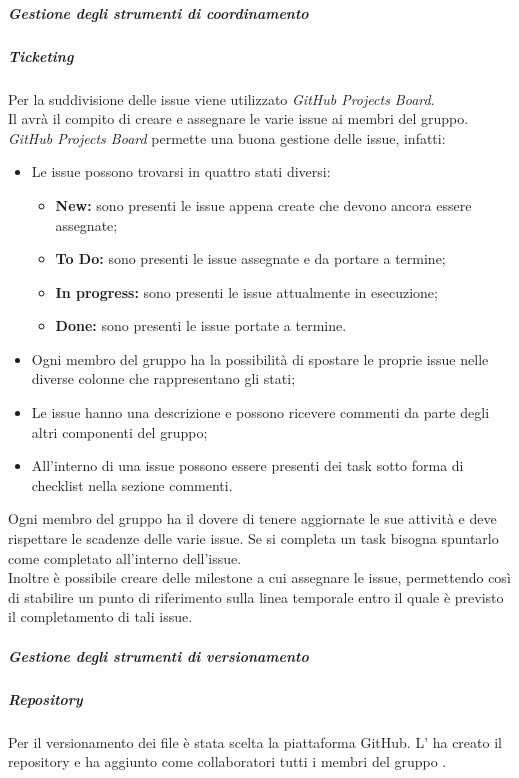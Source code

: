 \subparagraph{Gestione degli strumenti di coordinamento}
\subparagraph*{Ticketing}
Per la suddivisione delle issue\glo{} viene utilizzato \textit{GitHub Projects Board}\glo{}.\\
Il \roleProjectManagerLow{} avrà il compito di creare e assegnare le varie issue\glo{} ai membri del gruppo.\\
\textit{GitHub Projects Board}\glo{} permette una buona gestione delle issue\glo{}, infatti:
\begin{itemize}
  \item Le issue\glo{} possono trovarsi in quattro stati diversi:
        \begin{itemize}
          \item \textbf{New:} sono presenti le issue\glo{} appena create che devono ancora essere assegnate;
          \item \textbf{To Do:} sono presenti le issue\glo{} assegnate e da portare a termine;
          \item \textbf{In progress:} sono presenti le issue\glo{} attualmente in esecuzione;
          \item \textbf{Done:} sono presenti le issue\glo{} portate a termine.
        \end{itemize}
  \item Ogni membro del gruppo ha la possibilità di spostare le proprie issue\glo{} nelle diverse colonne che rappresentano gli stati;
  \item Le issue\glo{} hanno una descrizione e possono ricevere commenti da parte degli altri componenti del gruppo;
  \item All'interno di una issue\glo{} possono essere presenti dei task sotto forma di checklist nella sezione commenti.
\end{itemize}
Ogni membro del gruppo ha il dovere di tenere aggiornate le sue attività e deve rispettare le scadenze delle varie issue\glo{}.
Se si completa un task bisogna spuntarlo come completato all'interno dell'issue\glo{}.\\
Inoltre è possibile creare delle milestone\glo{} a cui assegnare le issue\glo{}, permettendo così di stabilire un punto di
riferimento sulla linea temporale entro il quale è previsto il completamento di tali issue\glo{}.

\subparagraph{Gestione degli strumenti di versionamento}
\subparagraph*{Repository}
Per il versionamento dei file è stata scelta la piattaforma GitHub\glo{}. L'\roleAdministratorLow{} ha creato il repository\glo{} e ha aggiunto
come collaboratori tutti i membri del gruppo \groupName{}.

